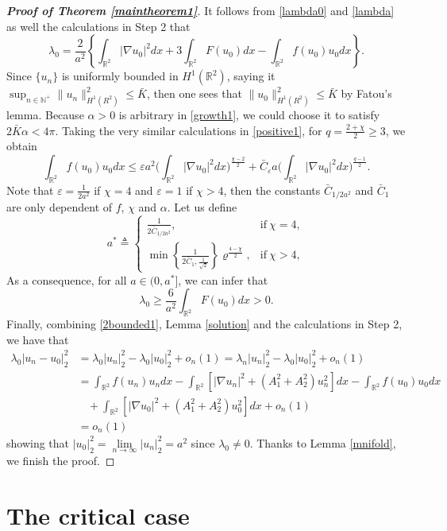 \documentclass[11pt]{amsart}
\numberwithin{equation}{section}
\theoremstyle{definition}
\newcommand{\R}{\mathbb{R}}
\begin{document}
\begin{proof}[\emph{\textbf{Proof of Theorem \ref{maintheorem1}}}]
 It follows from \eqref{lambda0} and \eqref{lambda} as well the calculations in Step 2 that
\[
\lambda_0=\frac2{a^2}\left\{\int_{\R^2} |\nabla u_0 |^2  dx+3\int_{\R^2} F(u_0 )dx
-\int_{\R^2} f (u_0 )u_0 dx\right\}.
\]
Since $\{u_n\}$ is uniformly bounded in $H^1(\R^2)$, saying it $\sup_{n\in \mathbb{N}^+}\|u_n\|_{H^1(R^2)}^2\leq \bar{K}$,
then one sees that $\|u_0\|_{H^1(R^2)}^2\leq \bar{K}$ by Fatou's lemma. Because $\alpha>0$ is arbitrary in \eqref{growth1},
we could choose it to satisfy $2\bar{K}\alpha<4\pi$. Taking the very similar calculations in \eqref{positive1}, for $q=\frac{2+\chi}{2}\geq3$, we obtain
\[
\int_{\R^2} f (u_0 )u_0 dx \leq \varepsilon a^2\bigg(\int_{\R^2} |\nabla u_0|^2 dx\bigg)^{\frac{\chi-2}{2}}
   +\bar{C}_\varepsilon a \bigg(\int_{\R^2} |\nabla u_0|^{2}dx\bigg)^{\frac{q-1}2}.
\]
Note that $\varepsilon=\frac1{2a^2}$ if $\chi=4$ and $\varepsilon=1$ if $\chi>4$,
then the constants $\bar{C}_{1/2a^2}$ and $\bar{C}_1$ are only dependent of $f$, $\chi$ and $\alpha$.
Let us define
\[
a^*\triangleq\left\{
      \begin{array}{ll}
        \frac1{2\bar{C}_{ 1/2a^2}}, &\text{if}~\chi=4, \\
         \min\left\{\frac1{2\bar{C}_1,\frac1{\sqrt{2}}}\right\}\varrho^{\frac{4-\chi}{2}}, &\text{if}~\chi>4,
      \end{array}
    \right.
\]
As a consequence, for all $a\in(0,a^*]$, we can infer that
\[
\lambda_0\geq\frac6{a^2}  \int_{\R^2} F(u_0 )dx>0.
\]
Finally, combining \eqref{2bounded1}, Lemma \ref{solution} and the calculations in Step 2, we have that
\begin{align*}
\lambda_0 |u_n-u_0 |_2^2 & =\lambda_0 |u_n|_2^2-\lambda_0 |u_0 |_2^2+o_n(1)
  =\lambda_n|u_n|_2^2-\lambda_0 |u_0 |_2^2+o_n(1)\\
&=\int_{\R^2} f(u_n )u_n dx -\int_{\R^2}[|\nabla u_n|^2+(A_1^2+A_2^2)u_n^2]dx
 -\int_{\R^2} f(u_0 )u_0 dx\\
 &\ \ \ \  +\int_{\R^2}[|\nabla u_0 |^2+(A_1^2+A_2^2)u_0 ^2]dx+o_n(1)\\
&=o_n(1)
\end{align*}
showing that $|u_0|_2^2=\lim\limits_{n\to\infty}|u_n|_2^2=a^2$ since $\lambda_0\neq0$. Thanks to Lemma \ref{mnifold},
we finish the proof.
\end{proof}

\section{The critical case}\label{Section4}
\end{document}
